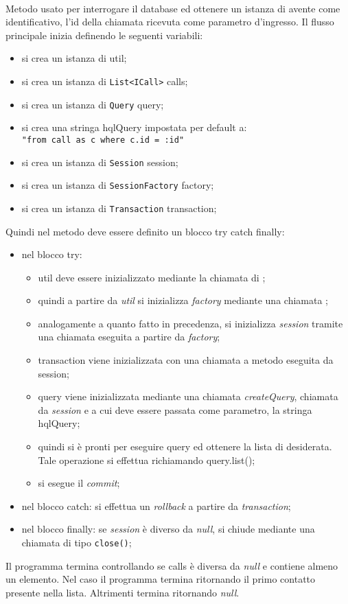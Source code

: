 \begin{description}
	\item{}\\
	Metodo usato per interrogare il database ed ottenere un istanza di  avente come identificativo, l'id della chiamata ricevuta come parametro d'ingresso. Il flusso principale inizia definendo le seguenti variabili:
	\begin{itemize}
		\item si crea un istanza di  util;
		\item si crea un istanza di \texttt{List<ICall>} calls;
		\item si crea un istanza di \texttt{Query} query;
		\item si crea una stringa hqlQuery impostata per default a:\\
			\verb|"from call as c where c.id = :id"|
		\item si crea un istanza di \texttt{Session} session;
		\item si crea un istanza di \texttt{SessionFactory} factory;
		\item si crea un istanza di \texttt{Transaction} transaction;
	\end{itemize}
	Quindi nel metodo deve essere definito un blocco try catch finally:
	\begin{itemize}
		\item nel blocco try:
		\begin{itemize}
			\item util deve essere inizializzato mediante la chiamata  di ;
			\item quindi a partire da \textit{util} si inizializza \textit{factory} mediante una chiamata ;
			\item analogamente a quanto fatto in precedenza, si inizializza \textit{session} tramite una chiamata  eseguita a partire da \textit{factory};
			\item transaction viene inizializzata con una chiamata a metodo  eseguita da session;
			\item query viene inizializzata mediante una chiamata \textit{createQuery}, chiamata da \textit{session} e a cui deve essere passata come parametro, la stringa hqlQuery;
			\item quindi si è pronti per eseguire query ed ottenere la lista di  desiderata. Tale operazione si effettua richiamando query.list();
			\item si esegue il \textit{commit};
		\end{itemize}
		\item nel blocco catch: si effettua un \textit{rollback} a partire da \textit{transaction};
		\item nel blocco finally: se \textit{session} è diverso da \textit{null}, si chiude mediante una chiamata di tipo \texttt{close()};
	\end{itemize}
	Il programma termina controllando se calls è diversa da \textit{null} e contiene almeno un elemento. Nel caso il programma termina ritornando il primo contatto presente nella lista. Altrimenti termina ritornando \textit{null}.
	

\end{description}

